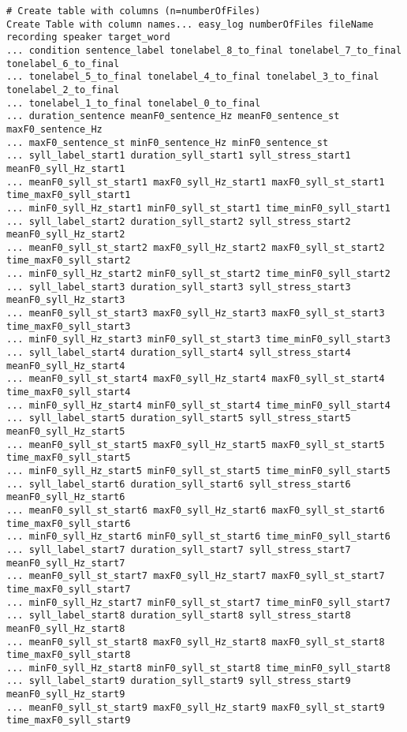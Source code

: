 \begin{Verbatim}[fontsize=\tiny]
# Create table with columns (n=numberOfFiles)
Create Table with column names... easy_log numberOfFiles fileName recording speaker target_word 
... condition sentence_label tonelabel_8_to_final tonelabel_7_to_final tonelabel_6_to_final 
... tonelabel_5_to_final tonelabel_4_to_final tonelabel_3_to_final tonelabel_2_to_final 
... tonelabel_1_to_final tonelabel_0_to_final 
... duration_sentence meanF0_sentence_Hz meanF0_sentence_st maxF0_sentence_Hz 
... maxF0_sentence_st minF0_sentence_Hz minF0_sentence_st 
... syll_label_start1 duration_syll_start1 syll_stress_start1 meanF0_syll_Hz_start1 
... meanF0_syll_st_start1 maxF0_syll_Hz_start1 maxF0_syll_st_start1 time_maxF0_syll_start1 
... minF0_syll_Hz_start1 minF0_syll_st_start1 time_minF0_syll_start1
... syll_label_start2 duration_syll_start2 syll_stress_start2 meanF0_syll_Hz_start2 
... meanF0_syll_st_start2 maxF0_syll_Hz_start2 maxF0_syll_st_start2 time_maxF0_syll_start2 
... minF0_syll_Hz_start2 minF0_syll_st_start2 time_minF0_syll_start2
... syll_label_start3 duration_syll_start3 syll_stress_start3 meanF0_syll_Hz_start3 
... meanF0_syll_st_start3 maxF0_syll_Hz_start3 maxF0_syll_st_start3 time_maxF0_syll_start3 
... minF0_syll_Hz_start3 minF0_syll_st_start3 time_minF0_syll_start3
... syll_label_start4 duration_syll_start4 syll_stress_start4 meanF0_syll_Hz_start4 
... meanF0_syll_st_start4 maxF0_syll_Hz_start4 maxF0_syll_st_start4 time_maxF0_syll_start4 
... minF0_syll_Hz_start4 minF0_syll_st_start4 time_minF0_syll_start4
... syll_label_start5 duration_syll_start5 syll_stress_start5 meanF0_syll_Hz_start5 
... meanF0_syll_st_start5 maxF0_syll_Hz_start5 maxF0_syll_st_start5 time_maxF0_syll_start5 
... minF0_syll_Hz_start5 minF0_syll_st_start5 time_minF0_syll_start5
... syll_label_start6 duration_syll_start6 syll_stress_start6 meanF0_syll_Hz_start6 
... meanF0_syll_st_start6 maxF0_syll_Hz_start6 maxF0_syll_st_start6 time_maxF0_syll_start6 
... minF0_syll_Hz_start6 minF0_syll_st_start6 time_minF0_syll_start6
... syll_label_start7 duration_syll_start7 syll_stress_start7 meanF0_syll_Hz_start7 
... meanF0_syll_st_start7 maxF0_syll_Hz_start7 maxF0_syll_st_start7 time_maxF0_syll_start7 
... minF0_syll_Hz_start7 minF0_syll_st_start7 time_minF0_syll_start7
... syll_label_start8 duration_syll_start8 syll_stress_start8 meanF0_syll_Hz_start8 
... meanF0_syll_st_start8 maxF0_syll_Hz_start8 maxF0_syll_st_start8 time_maxF0_syll_start8 
... minF0_syll_Hz_start8 minF0_syll_st_start8 time_minF0_syll_start8
... syll_label_start9 duration_syll_start9 syll_stress_start9 meanF0_syll_Hz_start9 
... meanF0_syll_st_start9 maxF0_syll_Hz_start9 maxF0_syll_st_start9 time_maxF0_syll_start9 

\end{Verbatim}
